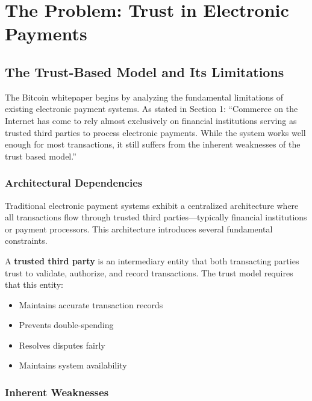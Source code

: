 
\section{The Problem: Trust in Electronic Payments}
\label{sec:problem-trust}

\subsection{The Trust-Based Model and Its Limitations}
\label{subsec:trust-model}

The Bitcoin whitepaper begins by analyzing the fundamental limitations of existing electronic payment systems. As stated in Section 1: ``Commerce on the Internet has come to rely almost exclusively on financial institutions serving as trusted third parties to process electronic payments. While the system works well enough for most transactions, it still suffers from the inherent weaknesses of the trust based model.''

\subsubsection{Architectural Dependencies}

Traditional electronic payment systems exhibit a centralized architecture where all transactions flow through trusted third parties---typically financial institutions or payment processors. This architecture introduces several fundamental constraints.

A \textbf{trusted third party} is an intermediary entity that both transacting parties trust to validate, authorize, and record transactions. The trust model requires that this entity:
\begin{itemize}
  \item Maintains accurate transaction records
  \item Prevents double-spending
  \item Resolves disputes fairly
  \item Maintains system availability
\end{itemize}

\subsubsection{Inherent Weaknesses}

